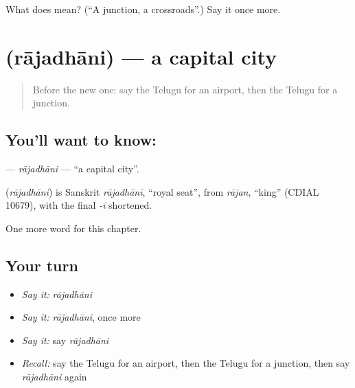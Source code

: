 \begin{tcolorbox}[breakable,colback=teal!4,colframe=teal!35!black,title={Before you move on}]
What does  mean? (\textquotedblleft{}A junction, a crossroads\textquotedblright{}.) Say it once more.
\end{tcolorbox}
\section[\texorpdfstring{\te{రాజధాని} (rājadhāni)}{రాజధాని (rājadhāni)}]{ (rājadhāni) — a capital city}

\label{lesson:TE-C214-rajadhani}



\begin{quote}
Before the new one: say the Telugu for an airport, then the Telugu for a junction.
\end{quote}

\subsection*{You'll want to know: }
\textbf{} — \emph{rājadhāni} — \textquotedblleft{}a capital city\textquotedblright{}.

\begin{cousinweb}
\textbf{} (\emph{rājadhāni}) is Sanskrit \emph{rājadhānī}, \textquotedblleft{}royal seat\textquotedblright{}, from \emph{rājan}, \textquotedblleft{}king\textquotedblright{} (CDIAL 10679), with the final \emph{-ī} shortened.
\end{cousinweb}

\begin{grammarlens}[title={What you've built}]
One more word for this chapter.
\end{grammarlens}

\subsection*{Your turn}
\begin{itemize}
\raggedright
  \item \emph{Say it:} \emph{rājadhāni}
  \item \emph{Say it:} \emph{rājadhāni}, once more
  \item \emph{Say it:} say \emph{rājadhāni}
  \item \emph{Recall:} say the Telugu for an airport, then the Telugu for a junction, then say \emph{rājadhāni} again
\end{itemize}

